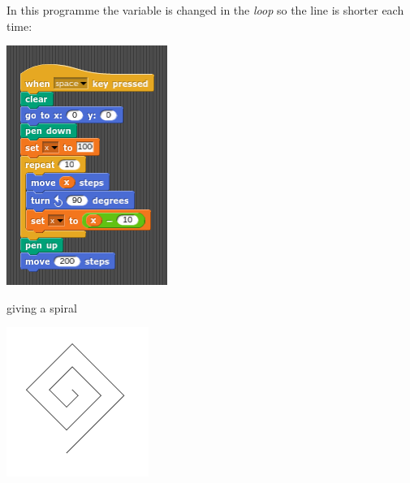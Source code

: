 \documentclass[11pt,a4paper]{scrartcl}
\begin{document}
In this programme the variable is changed in the \textsl{loop} so the
line is shorter each time:
\begin{center}
\includegraphics{spiral.png}
\end{center}
giving a spiral
\begin{center}
\includegraphics{spiral_pic.png}
\end{center}
\end{document}
